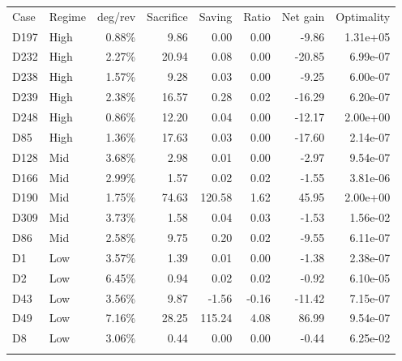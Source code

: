 \begin{tabular}{l l r r r r r r}
\hline\noalign{\smallskip}
Case & Regime & deg/rev & Sacrifice & Saving & Ratio & Net gain & Optimality \\
\noalign{\smallskip}\hline\noalign{\smallskip}
D197 & High & 0.88\% & 9.86 & 0.00 & 0.00 & -9.86 & 1.31e+05 \\
D232 & High & 2.27\% & 20.94 & 0.08 & 0.00 & -20.85 & 6.99e-07 \\
D238 & High & 1.57\% & 9.28 & 0.03 & 0.00 & -9.25 & 6.00e-07 \\
D239 & High & 2.38\% & 16.57 & 0.28 & 0.02 & -16.29 & 6.20e-07 \\
D248 & High & 0.86\% & 12.20 & 0.04 & 0.00 & -12.17 & 2.00e+00 \\
D85 & High & 1.36\% & 17.63 & 0.03 & 0.00 & -17.60 & 2.14e-07 \\
D128 & Mid & 3.68\% & 2.98 & 0.01 & 0.00 & -2.97 & 9.54e-07 \\
D166 & Mid & 2.99\% & 1.57 & 0.02 & 0.02 & -1.55 & 3.81e-06 \\
D190 & Mid & 1.75\% & 74.63 & 120.58 & 1.62 & 45.95 & 2.00e+00 \\
D309 & Mid & 3.73\% & 1.58 & 0.04 & 0.03 & -1.53 & 1.56e-02 \\
D86 & Mid & 2.58\% & 9.75 & 0.20 & 0.02 & -9.55 & 6.11e-07 \\
D1 & Low & 3.57\% & 1.39 & 0.01 & 0.00 & -1.38 & 2.38e-07 \\
D2 & Low & 6.45\% & 0.94 & 0.02 & 0.02 & -0.92 & 6.10e-05 \\
D43 & Low & 3.56\% & 9.87 & -1.56 & -0.16 & -11.42 & 7.15e-07 \\
D49 & Low & 7.16\% & 28.25 & 115.24 & 4.08 & 86.99 & 9.54e-07 \\
D8 & Low & 3.06\% & 0.44 & 0.00 & 0.00 & -0.44 & 6.25e-02 \\
\noalign{\smallskip}\hline
\end{tabular}